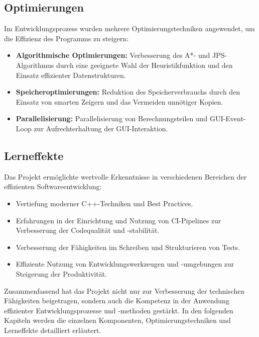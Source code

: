 \subsection*{Optimierungen}
Im Entwicklungsprozess wurden mehrere Optimierungstechniken angewendet, um die Effizienz des Programms zu steigern:
\begin{itemize}
\item \textbf{Algorithmische Optimierungen:} Verbesserung des A*- und \ac{JPS}-Algorithmus durch eine geeignete Wahl der Heuristikfunktion und den Einsatz effizienter Datenstrukturen.
\item \textbf{Speicheroptimierungen:} Reduktion des Speicherverbrauchs durch den Einsatz von smarten Zeigern und das Vermeiden unnötiger Kopien.
\item \textbf{Parallelisierung:} Parallelisierung von Berechnungsteilen und \ac{GUI}-Event-Loop zur Aufrechterhaltung der \ac{GUI}-Interaktion.
\end{itemize}

\subsection*{Lerneffekte}
Das Projekt ermöglichte wertvolle Erkenntnisse in verschiedenen Bereichen der effizienten Softwareentwicklung:
\begin{itemize}
\item Vertiefung moderner C++-Techniken und Best Practices.
\item Erfahrungen in der Einrichtung und Nutzung von CI-Pipelines zur Verbesserung der Codequalität und -stabilität.
\item Verbesserung der Fähigkeiten im Schreiben und Strukturieren von Tests.
\item Effiziente Nutzung von Entwicklungswerkzeugen und -umgebungen zur Steigerung der Produktivität.
\end{itemize}
Zusammenfassend hat das Projekt nicht nur zur Verbesserung der technischen Fähigkeiten beigetragen, sondern auch die Kompetenz in der Anwendung effizienter Entwicklungsprozesse und -methoden gestärkt.
In den folgenden Kapiteln werden die einzelnen Komponenten, Optimierungstechniken und Lerneffekte detailliert erläutert.



